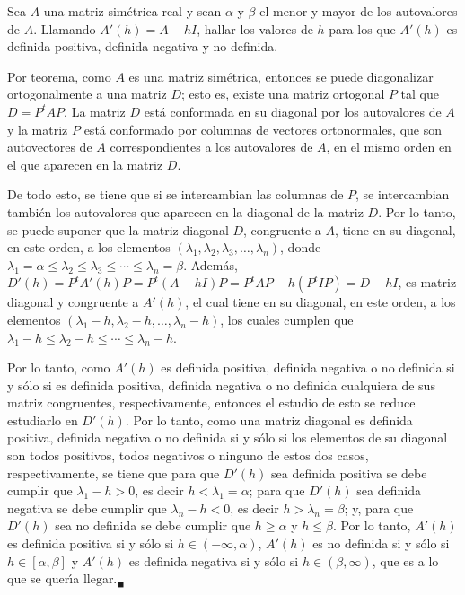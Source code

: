 \begin{enunciado}
 Sea $A$ una matriz sim\'etrica real y sean $\alpha$ y $\beta$ el menor y mayor de los autovalores de $A$. Llamando $A'(h) = A - hI$, hallar los valores de $h$ para los que $A'(h)$ es definida positiva, definida negativa y no definida.
\end{enunciado}

\begin{solucion}
 Por teorema, como $A$ es una matriz sim\'etrica, entonces se puede diagonalizar ortogonalmente a una matriz $D$; esto es, existe una matriz ortogonal $P$ tal que $D=P^tAP$. La matriz $D$ est\'a conformada en su diagonal por los autovalores de $A$ y la matriz $P$ est\'a conformado por columnas de vectores ortonormales, que son autovectores de $A$ correspondientes a los autovalores de $A$, en el mismo orden en el que aparecen en la matriz $D$.
 \par 
 De todo esto, se tiene que si se intercambian las columnas de $P$, se intercambian tambi\'en los autovalores que aparecen en la diagonal de la matriz $D$. Por lo tanto, se puede suponer que la matriz diagonal $D$, congruente a $A$, tiene en su diagonal, en este orden, a los elementos $(\lambda_1, \lambda_2, \lambda_3, \ldots, \lambda_n)$, donde $\lambda_1 = \alpha \leq \lambda_2 \leq \lambda_3 \leq \cdots \leq \lambda_n = \beta$. Adem\'as, $D'(h) = P^tA'(h)P = P^t(A-hI)P = P^tAP - h(P^tIP) = D - hI$, es matriz diagonal y congruente a $A'(h)$, el cual tiene en su diagonal, en este orden, a los elementos $(\lambda_1 - h, \lambda_2 - h, \ldots, \lambda_n - h)$, los cuales cumplen que $\lambda_1 -h \leq \lambda_2 - h \leq \cdots \leq \lambda_n - h$.
 \par 
 Por lo tanto, como $A'(h)$ es definida positiva, definida negativa o no definida si y s\'olo si es definida positiva, definida negativa o no definida cualquiera de sus matriz congruentes, respectivamente, entonces el estudio de esto se reduce estudiarlo en $D'(h)$. Por lo tanto, como una matriz diagonal es definida positiva, definida negativa o no definida si y s\'olo si los elementos de su diagonal son todos positivos, todos negativos o ninguno de estos dos casos, respectivamente, se tiene que para que $D'(h)$ sea definida positiva se debe cumplir que $\lambda_1-h > 0$, es decir $h <\lambda_1 = \alpha$; para que $D'(h)$ sea definida negativa se debe cumplir que $\lambda_n-h < 0$, es decir $h > \lambda_n = \beta$; y, para que $D'(h)$ sea no definida se debe cumplir que $h\geq \alpha$ y $h\leq\beta$. Por lo tanto, $A'(h)$ es definida positiva si y s\'olo si $h\in(-\infty, \alpha)$, $A'(h)$ es no definida si y s\'olo si $h\in[\alpha,\beta]$ y $A'(h)$ es definida negativa si y s\'olo si $h\in(\beta,\infty)$, que es a lo que se quer\'{\i}a llegar.${}_{\blacksquare}$
\end{solucion}
